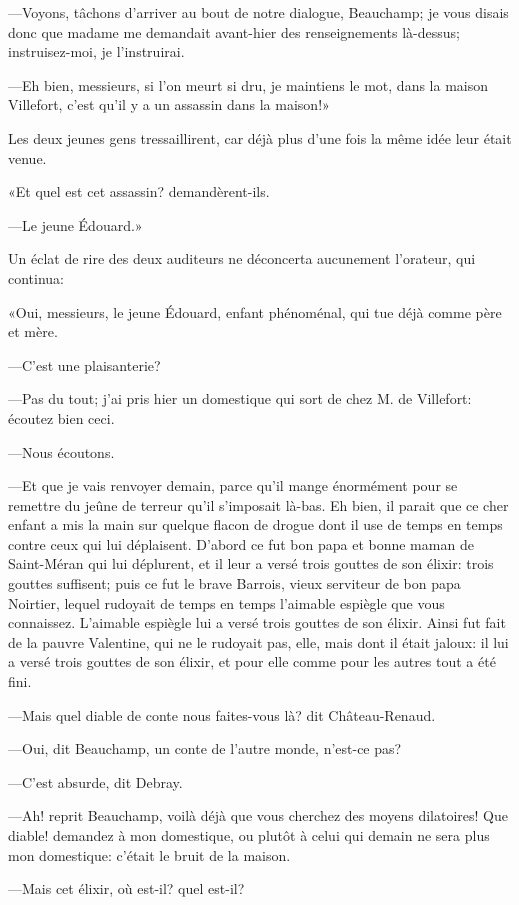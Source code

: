 —Voyons, tâchons d'arriver au bout de notre dialogue, Beauchamp; je vous disais donc que madame me demandait avant-hier des renseignements là-dessus; instruisez-moi, je l'instruirai. 

—Eh bien, messieurs, si l'on meurt si dru, je maintiens le mot, dans la maison Villefort, c'est qu'il y a un assassin dans la maison!» 

Les deux jeunes gens tressaillirent, car déjà plus d'une fois la même idée leur était venue. 

«Et quel est cet assassin? demandèrent-ils. 

—Le jeune Édouard.» 

Un éclat de rire des deux auditeurs ne déconcerta aucunement l'orateur, qui continua: 

«Oui, messieurs, le jeune Édouard, enfant phénoménal, qui tue déjà comme père et mère. 

—C'est une plaisanterie? 

—Pas du tout; j'ai pris hier un domestique qui sort de chez M. de Villefort: écoutez bien ceci. 

—Nous écoutons. 

—Et que je vais renvoyer demain, parce qu'il mange énormément pour se remettre du jeûne de terreur qu'il s'imposait là-bas. Eh bien, il parait que ce cher enfant a mis la main sur quelque flacon de drogue dont il use de temps en temps contre ceux qui lui déplaisent. D'abord ce fut bon papa et bonne maman de Saint-Méran qui lui déplurent, et il leur a versé trois gouttes de son élixir: trois gouttes suffisent; puis ce fut le brave Barrois, vieux serviteur de bon papa Noirtier, lequel rudoyait de temps en temps l'aimable espiègle que vous connaissez. L'aimable espiègle lui a versé trois gouttes de son élixir. Ainsi fut fait de la pauvre Valentine, qui ne le rudoyait pas, elle, mais dont il était jaloux: il lui a versé trois gouttes de son élixir, et pour elle comme pour les autres tout a été fini. 

—Mais quel diable de conte nous faites-vous là? dit Château-Renaud. 

—Oui, dit Beauchamp, un conte de l'autre monde, n'est-ce pas? 

—C'est absurde, dit Debray. 

—Ah! reprit Beauchamp, voilà déjà que vous cherchez des moyens dilatoires! Que diable! demandez à mon domestique, ou plutôt à celui qui demain ne sera plus mon domestique: c'était le bruit de la maison. 

—Mais cet élixir, où est-il? quel est-il? 

